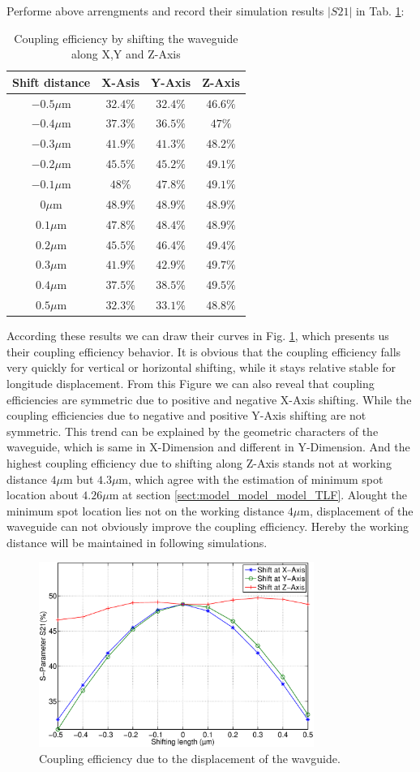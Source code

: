 Performe above arrengments and record their simulation results $|S21|$ in Tab. \ref{tab:shift_result}:
\begin{table}
\caption{Coupling efficiency by shifting the waveguide along X,Y and Z-Axis}
\centering
\begin{tabular}{c|ccc}
\hline
Shift distance & X-Asis & Y-Axis & Z-Axis \\
\hline
$-0.5\mu$m 		&$32.4\%$	&$32.4\%$&$46.6\%$	\\
$-0.4\mu$m		&$37.3\%$	&$36.5\%$&$47\%$	\\
$-0.3\mu$m 		&$41.9\%$	&$41.3\%$&$48.2\%$	\\
$-0.2\mu$m	  &$45.5\%$	&$45.2\%$&$49.1\%$	\\
$-0.1\mu$m		&$48\%$	&$47.8\%$&$49.1\%$	\\
$0\mu$m			  &$48.9\%$	&$48.9\%$&$48.9\%$	\\
$0.1\mu$m			&$47.8\%$	&$48.4\%$&$48.9\%$	\\
$0.2\mu$m			&$45.5\%$	&$46.4\%$&$49.4\%$	\\
$0.3\mu$m			&$41.9\%$	&$42.9\%$&$49.7\%$	\\
$0.4\mu$m			&$37.5\%$	&$38.5\%$&$49.5\%$	\\
$0.5\mu$m			&$32.3\%$	&$33.1\%$&$48.8\%$	\\
\hline
\end{tabular}
\label{tab:shift_result}
\end{table}
According these results we can draw their curves in Fig. \ref{fig:shift_curve}, which presents us their coupling efficiency behavior. It is obvious that the coupling efficiency falls very quickly for vertical or horizontal shifting, while it stays relative stable for longitude displacement. From this Figure we can also reveal that coupling efficiencies are symmetric due to positive and negative X-Axis shifting. While the coupling efficiencies due to negative and positive Y-Axis shifting are not symmetric. This trend can be explained by the geometric characters of the waveguide, which is same in X-Dimension and different in Y-Dimension. And the highest coupling efficiency due to shifting along Z-Axis stands not at working distance $4\mu$m but $4.3\mu$m, which agree with the estimation of minimum spot location about $4.26\mu$m at section \ref{sect:model_model_model_TLF}. Alought the minimum spot location lies not on the working distance $4\mu$m, displacement of the waveguide can not obviously improve the coupling efficiency. Hereby the working distance will be maintained in following simulations.
  
\begin{figure}[!ht]
\centering
\includegraphics[width=0.8\textwidth]{bilder/shift_curve}
\caption{Coupling efficiency due to the displacement of the wavguide.}
\label{fig:shift_curve}
\end{figure}
